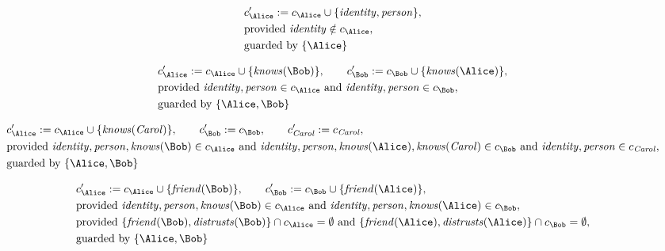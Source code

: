 \begin{align*}
&
c'_
{
\Alice
}
 := 
c_
{
\Alice
}
 \cup 
\{
\mathit{\detokenize{
identity
}}
,
\mathit{\detokenize{
person
}}
\}
,\\
&
\text{provided } 
\mathit{\detokenize{
identity
}}
 \notin c_
{
\Alice
}
,\\
&
\text{guarded by } \{
\Alice
\}
\end{align*}

\begin{align*}
&
c'_
{
\Alice
}
 := 
c_
{
\Alice
}
 \cup 
\{
\mathit{\detokenize{
knows
}}
(
\Bob
)
\}
, \qquad 
c'_
{
\Bob
}
 := 
c_
{
\Bob
}
 \cup 
\{
\mathit{\detokenize{
knows
}}
(
\Alice
)
\}
,\\
&
\text{provided } 
\mathit{\detokenize{
identity
}}
,
\mathit{\detokenize{
person
}}
 \in c_
{
\Alice
}
 \text{ and } 
\mathit{\detokenize{
identity
}}
,
\mathit{\detokenize{
person
}}
 \in c_
{
\Bob
}
,\\
&
\text{guarded by } \{
\Alice
,
\Bob
\}
\end{align*}

\begin{align*}
&
c'_
{
\Alice
}
 := 
c_
{
\Alice
}
 \cup 
\{
\mathit{\detokenize{
knows
}}
(
\mathit{Carol}
)
\}
, \qquad 
c'_
{
\Bob
}
 := 
c_
{
\Bob
}
, \qquad 
c'_
{
\mathit{Carol}
}
 := 
c_
{
\mathit{Carol}
}
,\\
&
\text{provided } 
\mathit{\detokenize{
identity
}}
,
\mathit{\detokenize{
person
}}
,
\mathit{\detokenize{
knows
}}
(
\Bob
)
 \in c_
{
\Alice
}
 \text{ and } 
\mathit{\detokenize{
identity
}}
,
\mathit{\detokenize{
person
}}
,
\mathit{\detokenize{
knows
}}
(
\Alice
)
,
\mathit{\detokenize{
knows
}}
(
\mathit{Carol}
)
 \in c_
{
\Bob
}
 \text{ and } 
\mathit{\detokenize{
identity
}}
,
\mathit{\detokenize{
person
}}
 \in c_
{
\mathit{Carol}
}
,\\
&
\text{guarded by } \{
\Alice
,
\Bob
\}
\end{align*}

\begin{align*}
&
c'_
{
\Alice
}
 := 
c_
{
\Alice
}
 \cup 
\{
\mathit{\detokenize{
friend
}}
(
\Bob
)
\}
, \qquad 
c'_
{
\Bob
}
 := 
c_
{
\Bob
}
 \cup 
\{
\mathit{\detokenize{
friend
}}
(
\Alice
)
\}
,\\
&
\text{provided } 
\mathit{\detokenize{
identity
}}
,
\mathit{\detokenize{
person
}}
,
\mathit{\detokenize{
knows
}}
(
\Bob
)
 \in c_
{
\Alice
}
 \text{ and } 
\mathit{\detokenize{
identity
}}
,
\mathit{\detokenize{
person
}}
,
\mathit{\detokenize{
knows
}}
(
\Alice
)
 \in c_
{
\Bob
}
,\\
&
\text{provided } 
\{
\mathit{\detokenize{
friend
}}
(
\Bob
)
,
\mathit{\detokenize{
distrusts
}}
(
\Bob
)
\}
 \cap c_
{
\Alice
}
 = \emptyset
 \text{ and } 
\{
\mathit{\detokenize{
friend
}}
(
\Alice
)
,
\mathit{\detokenize{
distrusts
}}
(
\Alice
)
\}
 \cap c_
{
\Bob
}
 = \emptyset
,\\
&
\text{guarded by } \{
\Alice
,
\Bob
\}
\end{align*}
